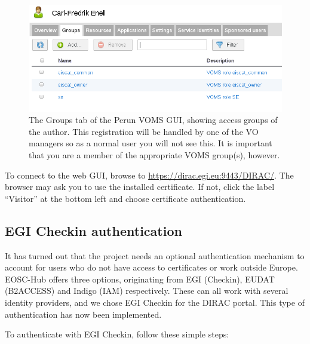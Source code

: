 \documentclass[a4paper]{article}
\begin{document}
\begin{figure}[htb]
  \centering
  \includegraphics[width=1.0\linewidth]{voms-groups-perun}
  \caption{The Groups tab of the Perun VOMS GUI, showing access groups of the author. This registration will be handled by one of the VO managers so as a normal user you will not see this. It is important that you are a member of the appropriate VOMS group(s), however.}
  \label{fig:perun}
\end{figure}


To connect to the web GUI, browse to
\url{https://dirac.egi.eu:9443/DIRAC/}. The browser may ask you to use
the installed certificate. If not, click the label ``Visitor'' at the
bottom left and choose certificate authentication.


\subsection{EGI Checkin authentication}
\label{sec:checkin-auth}

It has turned out that the project needs an optional authentication
mechanism to account for users who do not have access to certificates
or work outside Europe. EOSC-Hub offers three options, originating from EGI (Checkin), EUDAT (B2ACCESS) and Indigo (IAM) respectively. These can all work with several identity providers, and we chose EGI Checkin for the DIRAC portal. This type of authentication has now been implemented.

To authenticate with EGI Checkin, follow these simple steps:
\end{document}

